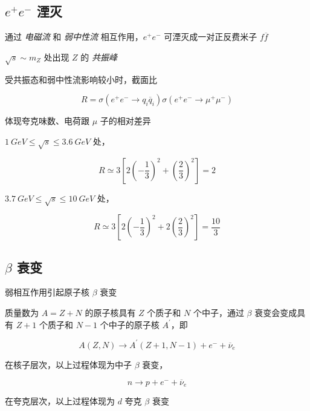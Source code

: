 \subsection{\texorpdfstring{$e^+e^-$}{e+e-} 湮灭}

通过 \emph{电磁流} 和 \emph{弱中性流} 相互作用，$e^+ e^-$ 可湮灭成一对正反费米子 $f \overline{f}$

$\sqrt{s} \sim m_Z$ 处出现 $Z$ 的 \emph{共振峰}

受共振态和弱中性流影响较小时，截面比

\begin{equation}
    R = \sigma(e^+ e^- \to q_i \overline{q}_i ) \sigma(e^+ e^- \to \mu^+ \mu^-)
\end{equation}

体现夸克味数、电荷跟 $\mu$ 子的相对差异

$1\ GeV \le \sqrt{s} \le 3.6\ GeV$ 处，

\begin{equation}
    R \simeq 3 \left[2  \left(-\frac{1}{3}\right)^2 +  \left(\frac{2}{3}\right)^2 \right] = 2
\end{equation}

$3.7\ GeV \le \sqrt{s} \le 10\ GeV$ 处，

\begin{equation}
    R \simeq 3 \left[2 \left(-\frac{1}{3}\right)^2 +  2 \left(\frac{2}{3}\right)^2 \right] = \frac{10}{3}
\end{equation}

\subsection{\texorpdfstring{$\beta$}{beta} 衰变}

弱相互作用引起原子核 $\beta$ 衰变

质量数为 $A=Z+N$ 的原子核具有 $Z$ 个质子和 $N$ 个中子，通过 $\beta$ 衰变会变成具有 $Z+1$ 个质子和 $N-1$ 个中子的原子核 $A^\prime$，即

\begin{equation}
    A(Z, N) \to A^\prime(Z+1, N-1) + e^- + \overline{\nu}_e
\end{equation}

在核子层次，以上过程体现为中子 $\beta$ 衰变，

\begin{equation}
    n \to p + e^- + \overline{\nu}_e
\end{equation}

在夸克层次，以上过程体现为 $d$ 夸克 $\beta$ 衰变

